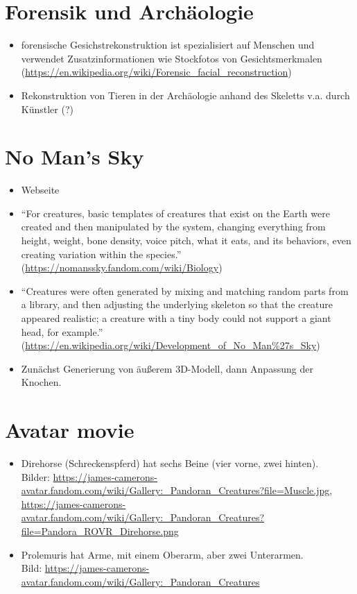 \section{Forensik und Archäologie}

\begin{itemize}
 \item forensische Gesichstrekonstruktion ist spezialisiert auf Menschen und verwendet Zusatzinformationen wie Stockfotos von Gesichtsmerkmalen (\url{https://en.wikipedia.org/wiki/Forensic_facial_reconstruction})
 \item Rekonstruktion von Tieren in der Archäologie anhand des Skeletts v.a. durch Künstler (?)
\end{itemize}


\section{No Man's Sky}

\begin{itemize}
 \item Webseite \cite{NoMansSky}
 \item "`For creatures, basic templates of creatures that exist on the Earth were created and then manipulated by the system, changing everything from height, weight, bone density, voice pitch, what it eats, and its behaviors, even creating variation within the species."' (\url{https://nomanssky.fandom.com/wiki/Biology})
 \item "`Creatures were often generated by mixing and matching random parts from a library, and then adjusting the underlying skeleton so that the creature appeared realistic; a creature with a tiny body could not support a giant head, for example."' (\url{https://en.wikipedia.org/wiki/Development_of_No_Man\%27s_Sky})
 \item Zunächst Generierung von äußerem 3D-Modell, dann Anpassung der Knochen.
\end{itemize}

\section{Avatar movie}

\begin{itemize}
 \item Direhorse (Schreckenspferd) hat sechs Beine (vier vorne, zwei hinten).\\
 Bilder: \url{https://james-camerons-avatar.fandom.com/wiki/Gallery:_Pandoran_Creatures?file=Muscle.jpg}, \url{https://james-camerons-avatar.fandom.com/wiki/Gallery:_Pandoran_Creatures?file=Pandora_ROVR_Direhorse.png}
 \item Prolemuris hat Arme, mit einem Oberarm, aber zwei Unterarmen.\\
 Bild: \url{https://james-camerons-avatar.fandom.com/wiki/Gallery:_Pandoran_Creatures}
\end{itemize}


